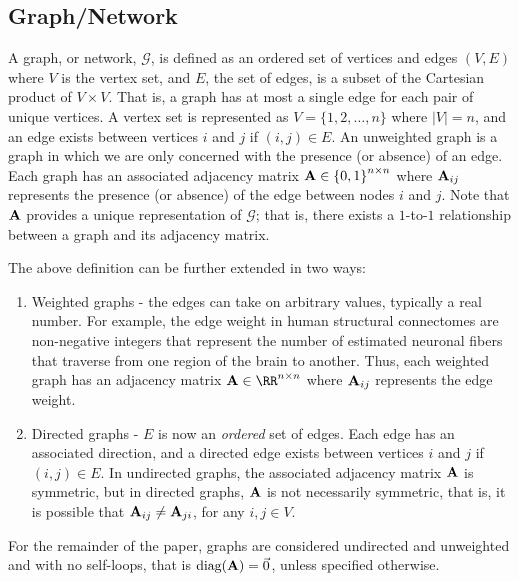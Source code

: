 \subsection{Graph/Network}
\label{sec:unwt_graph}
A graph, or network, $\mathcal{G}$, is defined as an ordered set of vertices and edges $(V, E)$ where $V$ is the vertex set, and $E$, the set of edges, is a subset of the Cartesian product of $V \times V$. That is, a graph has at most a single edge for each pair of unique vertices. A vertex set is represented as $V=\{1, 2, \ldots, n\}$ where $|V| = n$, and an edge exists between vertices $i$ and $j$ if $(i, j)\in E$. An unweighted graph is a graph in which we are only concerned with the presence (or absence) of an edge. Each graph has an associated adjacency matrix $\operatorname{\mathbf{A}} \in \left\{0, 1\right\}^{n\times n}$ where $\operatorname{\mathbf{A}}_{ij}$ represents the presence (or absence) of the edge between nodes $i$ and $j$. Note that $\operatorname{\mathbf{A}}$ provides a unique representation of $\mathcal{G}$; that is, there exists a $1$-to-$1$ relationship between a graph and its adjacency matrix. 

The above definition can be further extended in two ways: 
\begin{enumerate}
    \item Weighted graphs - the edges can take on arbitrary values, typically a real number. For example, the edge weight in human structural connectomes are non-negative integers that represent the number of estimated neuronal fibers that traverse from one region of the brain to another. Thus, each weighted graph has an adjacency matrix $\A\in\RR^{n \times n}$ where $\operatorname{\mathbf{A}}_{ij}$ represents the edge weight.
    \item Directed graphs - $E$ is now an \textit{ordered} set of edges. Each edge has an associated direction, and a directed edge exists between vertices $i$ and $j$ if $(i,j)\in E$. In undirected graphs, the associated adjacency matrix $\operatorname{\mathbf{A}}$ is symmetric, but in directed graphs, $\operatorname{\mathbf{A}}$ is not necessarily symmetric, that is, it is possible that $\operatorname{\mathbf{A}}_{ij}\neq\operatorname{\mathbf{A}}_{ji}$, for any $i, j\in V$.
\end{enumerate}

For the remainder of the paper, graphs are considered undirected and unweighted and with no self-loops, that is $\text{diag}(\operatorname{\mathbf{A}}) = \Vec{0}$, unless specified otherwise.

